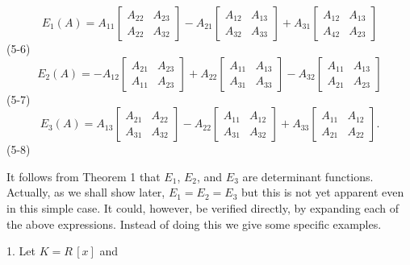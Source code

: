 \[E_{1}(A)=A_{11}\begin{bmatrix}A_{22}&A_{23}\\ A_{22}&A_{32}\end{bmatrix}-A_{21}\begin{bmatrix}A_{12}&A_{13}\\ A_{32}&A_{33}\end{bmatrix}+A_{31}\begin{bmatrix}A_{12}&A_{13}\\ A_{42}&A_{23}\end{bmatrix}\] (5-6) \[E_{2}(A)=-A_{12}\begin{bmatrix}A_{21}&A_{23}\\ A_{11}&A_{23}\end{bmatrix}+A_{22}\begin{bmatrix}A_{11}&A_{13}\\ A_{31}&A_{33}\end{bmatrix}-A_{32}\begin{bmatrix}A_{11}&A_{13}\\ A_{21}&A_{23}\end{bmatrix}\] (5-7) \[E_{3}(A)=A_{13}\begin{bmatrix}A_{21}&A_{22}\\ A_{31}&A_{32}\end{bmatrix}-A_{22}\begin{bmatrix}A_{11}&A_{12}\\ A_{31}&A_{32}\end{bmatrix}+A_{33}\begin{bmatrix}A_{11}&A_{12}\\ A_{21}&A_{22}\end{bmatrix}.\] (5-8)

It follows from Theorem 1 that \(E_{1}\), \(E_{2}\), and \(E_{3}\) are determinant functions. Actually, as we shall show later, \(E_{1}=E_{2}=E_{3}\) but this is not yet apparent even in this simple case. It could, however, be verified directly, by expanding each of the above expressions. Instead of doing this we give some specific examples.

1. Let \(K=R\,[x]\) and 